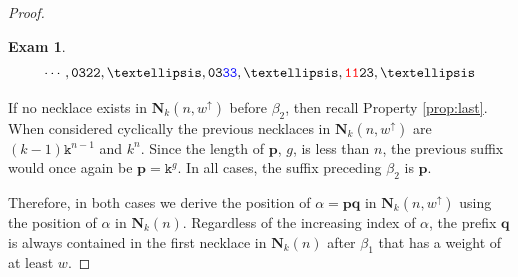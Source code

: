 \documentclass[10pt,a4paper]{amsart}
\newtheorem{exam}{Exam}
\newcommand{\bN}{\mathbf{N}}
\newcommand{\bp}{\mathbf{p}}
\newcommand{\bq}{\mathbf{q}}
\renewcommand{\tt} {\mathtt}
\begin{document}
\begin{proof}
\begin{enumerate}
\begin{exam}
    \[ \tt{\cdots, 0322, \ldots, 03\textcolor{blue}{33}, \ldots, \textcolor{red}{11}23}, \ldots \]
    \end{exam}
    
    If no necklace exists in $\bN_k(n,w^\uparrow)$ before $\beta_2$, then recall Property \ref{prop:last}. When considered cyclically the previous necklaces in $\bN_k(n,w^\uparrow)$ are $(k-1) \tt{k}^{n-1}$ and $k^n$. Since the length of $\bp$, $g$, is less than $n$, the previous suffix would once again be $\bp = \tt{k}^g$. In all cases, the suffix preceding $\beta_2$ is $\bp$.

\end{enumerate}


Therefore, in both cases we derive the position of $\alpha = \bp \bq$ in $\bN_k(n,w^\uparrow)$ using the position of $\alpha$ in $\bN_k(n)$. Regardless of the increasing index of $\alpha$, the prefix $\bq$ is always contained in the first necklace in $\bN_k(n)$ after $\beta_1$ that has a weight of at least $w$.
%
\end{proof}
\end{document}
